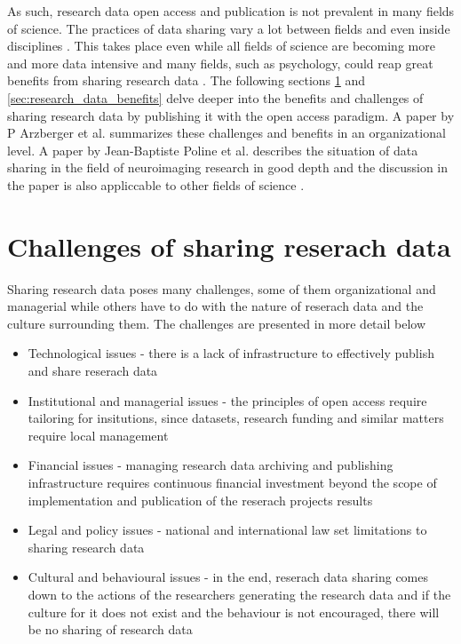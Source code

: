 As such, research data open access and publication is not prevalent in many
fields of science. The practices of data sharing vary a lot between fields and
even inside disciplines \cite{DBLP:journals/jasis/Borgman12}
\cite{cragin2010data}. This takes place even while all fields of science are
becoming more and more data intensive and many fields, such as psychology,
could reap great benefits from sharing research data
\cite{DBLP:books/ms/4paradigm09} \cite{wicherts2006poor}. The following
sections \ref{sec:research_data_challenges} and \ref{sec:research_data_benefits}
delve deeper into the benefits and challenges of sharing research data by
publishing it with the open access paradigm. A paper by P Arzberger et al.
\cite{DBLP:journals/datascience/ArzbergerSBBCLMUW04} summarizes these
challenges and benefits in an organizational level. A paper by Jean-Baptiste
Poline et al. describes the situation of data sharing in the field of
neuroimaging research in good depth and the discussion in the paper is also
appliccable to other fields of science
\cite{DBLP:journals/fini/PolineBGGHHHHKMPSAK12}.

\section{Challenges of sharing reserach data}
\label{sec:research_data_challenges}

Sharing research data poses many challenges, some of them organizational and
managerial while others have to do with the nature of reserach data and the
culture surrounding them. The challenges are presented in more detail below
\cite{DBLP:journals/datascience/ArzbergerSBBCLMUW04}
\cite{tenopir2011data}

\begin{itemize}
    \item Technological issues - there is a lack of infrastructure to
          effectively publish and share reserach data
    \item Institutional and managerial issues - the principles of open access
          require tailoring for insitutions, since datasets, research funding
          and similar matters require local management
    \item Financial issues - managing research data archiving and publishing
          infrastructure requires continuous financial investment beyond the
          scope of implementation and publication of the reserach projects
          results
    \item Legal and policy issues - national and international law set
          limitations to sharing research data
    \item Cultural and behavioural issues - in the end, reserach data sharing
          comes down to the actions of the researchers generating the research
          data and if the culture for it does not exist and the behaviour is
          not encouraged, there will be no sharing of research data
\end{itemize}

